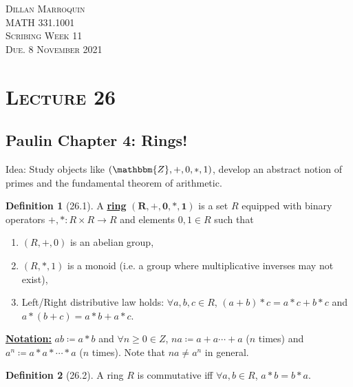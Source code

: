 \documentclass{article}
\newcommand{\Z}{\mathbbm{Z}}
\newcommand{\coleq}{\coloneqq}
\newcommand{\define}[1]{\textbf{\underline{#1}}}
\newcommand{\func}[3]{#1: #2 \to #3}
\theoremstyle{definition}
\newtheorem*{defn}{Definition}
\theoremstyle{remark}
\begin{document}
    \begin{center}
        \textsc{Dillan Marroquin\\MATH 331.1001\\Scribing Week 11\\Due. 8 November 2021\\}
    \end{center}
        
    \section*{\textbf{\textsc{Lecture 26}}}{
        \subsection*{Paulin Chapter 4: Rings!}{
            \noindent Idea: Study objects like $(\Z,+,0,*,1)$, develop an abstract notion of primes and the fundamental theorem of arithmetic.
            
            \begin{defn}[26.1]
                A \define{ring} $\mathbf{(R,+,0,*,1)}$ is a set $R$ equipped with binary operators $\func{+,*}{R\times R}{R}$ and elements $0,1\in R$ such that
                \begin{enumerate}
                    \item $(R,+,0)$ is an abelian group,
                    \item $(R,*,1)$ is a monoid (i.e. a group where multiplicative inverses may not exist),
                    \item Left/Right distributive law holds: $\forall a,b,c\in R$, $(a+b)*c=a*c+b*c$ and $a*(b+c)=a*b+a*c$.
                \end{enumerate}
            \end{defn}
            
            \noindent \define{Notation:} $ab\coleq a*b$ and $\forall n\geq 0 \in Z$, $na\coleq a+a\cdots+a$ ($n$ times) and $a^n\coleq a*a*\cdots *a$ ($n$ times). Note that $na\neq a^n$ in general.
            
            \begin{defn}[26.2]
                A ring $R$ is commutative iff $\forall a,b \in R$, $a*b=b*a$.
            \end{defn}
        }
}
\end{document}
